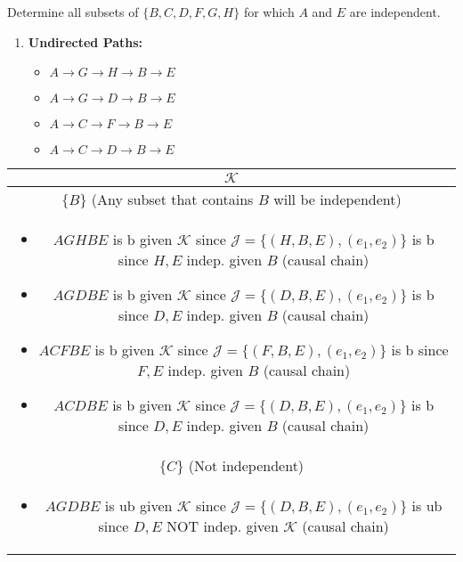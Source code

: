 \begin{example}
    Determine all subsets of $\{B,C,D,F,G,H\}$ for which $A$ and $E$ are independent. 
    \begin{enumerate}
        \item \textbf{Undirected Paths:}
        \begin{itemize}
            \item $A \to G \to H \to B \to E$
            \item $A \to G \to D \to B \to E$
            \item $A \to C \to F \to B \to E$
            \item $A \to C \to D \to B \to E$
        \end{itemize}
    \end{enumerate}
    \begin{center}
        \begin{tabular}{c}
            \toprule
            $\mathcal{K}$ \\
            \midrule
            $\{B\}$ (Any subset that contains $B$ will be independent) \\
            \multicolumn{1}{p{\linewidth}}{
                \begin{itemize}
                    \item $AGHBE$ is b given $\mathcal{K}$ since $\mathcal{J} = \{(H,B,E),(e_1,e_2)\}$ is b since $H,E$ indep. given $B$ (causal chain)
                    \item $AGDBE$ is b given $\mathcal{K}$ since $\mathcal{J} = \{(D,B,E),(e_1,e_2)\}$ is b since $D,E$ indep. given $B$ (causal chain)
                    \item $ACFBE$ is b given $\mathcal{K}$ since $\mathcal{J} = \{(F,B,E),(e_1,e_2)\}$ is b since $F,E$ indep. given $B$ (causal chain) 
                    \item $ACDBE$ is b given $\mathcal{K}$ since $\mathcal{J} = \{(D,B,E),(e_1,e_2)\}$ is b since $D,E$ indep. given $B$ (causal chain) 
                \end{itemize}} \\
            \midrule
            $\{C\}$ (Not independent) \\
            \multicolumn{1}{p{\linewidth}}{
                \begin{itemize}
                    \item $AGDBE$ is ub given $\mathcal{K}$ since $\mathcal{J} = \{(D,B,E),(e_1,e_2)\}$ is ub since $D,E$ NOT indep. given $\mathcal{K}$ (causal chain)

\end{itemize}}
\end{tabular}
\end{center}
\end{example}
